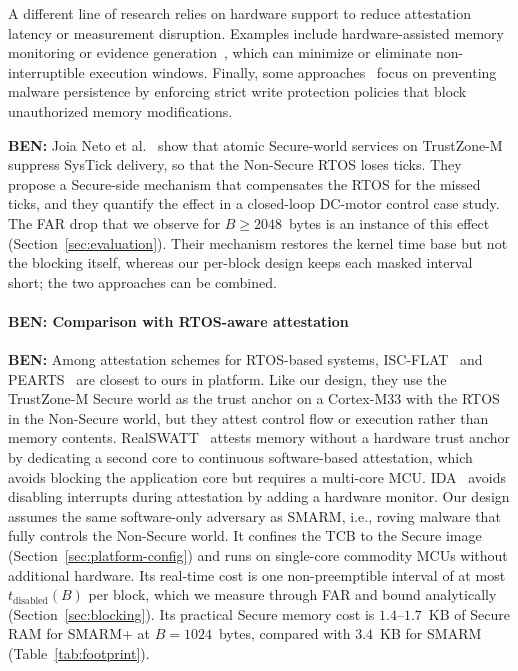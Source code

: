 \documentclass{ieeeaccess}
\DeclareRobustCommand{\ben}[1]{{\color{BENcolor}\textbf{BEN:} #1}}
\newcommand{\rtsmarm}{SMARM+\xspace}
\begin{document}
A different line of research relies on hardware support to reduce attestation latency or measurement disruption.
Examples include hardware-assisted memory monitoring or evidence generation~\cite{li2023interruptible,lofat,litehax,atrium}, which can minimize or eliminate non-interruptible execution windows.
Finally, some approaches~\cite{casu,rata} focus on preventing malware persistence by enforcing strict write protection policies that block unauthorized memory modifications.

\ben{Joia Neto et al.~\cite{joianeto2026timekeeping} show that atomic Secure-world services on TrustZone-M suppress SysTick delivery, so that the Non-Secure RTOS loses ticks.
They propose a Secure-side mechanism that compensates the RTOS for the missed ticks, and they quantify the effect in a closed-loop DC-motor control case study.
The FAR drop that we observe for $B \ge 2048$~bytes is an instance of this effect (Section~\ref{sec:evaluation}).
Their mechanism restores the kernel time base but not the blocking itself, whereas our per-block design keeps each masked interval short; the two approaches can be combined.}

\paragraph{\ben{Comparison with RTOS-aware attestation}}
\ben{Among attestation schemes for RTOS-based systems, ISC-FLAT~\cite{iscflat} and PEARTS~\cite{pearts} are closest to ours in platform.
Like our design, they use the TrustZone-M Secure world as the trust anchor on a Cortex-M33 with the RTOS in the Non-Secure world, but they attest control flow or execution rather than memory contents.
RealSWATT~\cite{realswatt} attests memory without a hardware trust anchor by dedicating a second core to continuous software-based attestation, which avoids blocking the application core but requires a multi-core MCU.
IDA~\cite{ida2024} avoids disabling interrupts during attestation by adding a hardware monitor.
Our design assumes the same software-only adversary as SMARM, i.e., roving malware that fully controls the Non-Secure world.
It confines the TCB to the Secure image (Section~\ref{sec:platform-config}) and runs on single-core commodity MCUs without additional hardware.
Its real-time cost is one non-preemptible interval of at most $t_{\text{disabled}}(B)$ per block, which we measure through FAR and bound analytically (Section~\ref{sec:blocking}).
Its practical Secure memory cost is $1.4$--$1.7$~KB of Secure RAM for \rtsmarm at $B = 1024$~bytes, compared with $3.4$~KB for SMARM (Table~\ref{tab:footprint}).}
\end{document}
